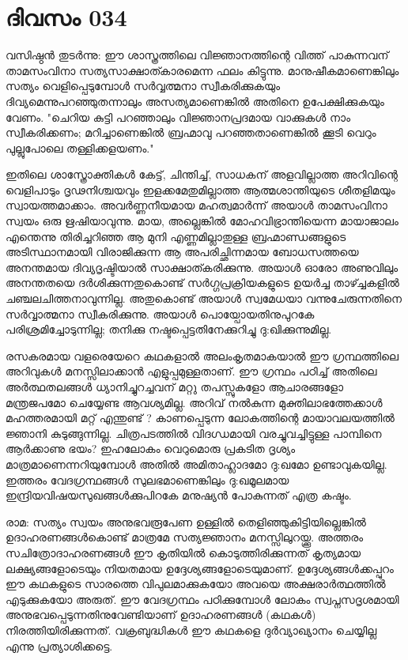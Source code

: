  
\section{ദിവസം 034}


വസിഷ്ഠന്‍ തുടര്‍ന്നു: ഈ ശാസ്ത്രത്തിലെ വിജ്ഞാനത്തിന്റെ വിത്ത്‌ പാകുന്നവന്‌  താമസംവിനാ സത്യസാക്ഷാത്കാരമെന്ന ഫലം കിട്ടുന്നു. മാനുഷീകമാണെങ്കിലും സത്യം വെളിപ്പെടുമ്പോള്‍ സര്‍വ്വത്മനാ സ്വീകരിക്കുകയും ദിവ്യമെന്നുപറഞ്ഞുതന്നാലും അസത്യമാണെങ്കില്‍ അതിനെ ഉപേക്ഷിക്കുകയും വേണം. "ചെറിയ കുട്ടി പറഞ്ഞാലും വിജ്ഞാനപ്രദമായ വാക്കുകള്‍ നാം സ്വീകരിക്കണം;  മറിച്ചാണെങ്കില്‍ ബ്രഹ്മാവു പറഞ്ഞതാണെങ്കില്‍ ക്കൂടി വെറും പുല്ലുപോലെ തള്ളിക്കളയണം."

ഇതിലെ ശാസ്ത്രോക്തികള്‍ കേട്ട്‌, ചിന്തിച്ച്‌, സാധകന്‌ അളവില്ലാത്ത അറിവിന്റെ വെളിപാടും ദൃഢനിശ്ചയവും ഇളക്കമേതുമില്ലാത്ത ആത്മശാന്തിയുടെ ശീതളിമയും സ്വായത്തമാക്കാം. അവര്‍ണ്ണനീയമായ മഹത്വമാര്‍ന്ന് അയാള്‍ താമസംവിനാ സ്വയം ഒരു ഋഷിയാവുന്നു. മായ, അല്ലെങ്കില്‍ മോഹവിഭ്രാന്തിയെന്ന മായാജാലം എന്തെന്നു തിരിച്ചറിഞ്ഞ ആ മുനി എണ്ണമില്ലാതുള്ള ബ്രഹ്മാണ്ഡങ്ങളുടെ അടിസ്ഥാനമായി വിരാജിക്കുന്ന ആ അപരിച്ഛിന്നമായ ബോധസത്തയെ അനന്തമായ ദിവ്യദൃഷ്ടിയാല്‍ സാക്ഷാത്കരിക്കുന്നു. അയാള്‍ ഓരോ അണുവിലും അനന്തതയെ ദര്‍ശിക്കുന്നതുകൊണ്ട്‌ സര്‍ഗ്ഗപ്രക്രിയകളുടെ ഉയര്‍ച്ച താഴ്ച്ചകളില്‍ ചഞ്ചലചിത്തനാവുന്നില്ല. അതുകൊണ്ട്‌ അയാള്‍ സ്വമേധയാ വന്നുചേരുന്നതിനെ സര്‍വ്വാത്മനാ സ്വീകരിക്കുന്നു. അയാള്‍ പൊയ്പോയതിനുപുറകേ പരിശ്രമിച്ചോടുന്നില്ല; തനിക്കു നഷ്ടപ്പെട്ടതിനേക്കുറിച്ചു ദു:ഖിക്കുന്നുമില്ല. 

രസകരമായ വളരെയേറെ കഥകളാല്‍ അലംകൃതമാകയാല്‍ ഈ ഗ്രന്ഥത്തിലെ അറിവുകള്‍ മനസ്സിലാക്കാന്‍ എളുപ്പമുള്ളതാണ്‌. ഈ ഗ്രന്ഥം പഠിച്ച്‌ അതിലെ അര്‍ത്ഥതലങ്ങള്‍ ധ്യാനിച്ചുറച്ചവന്‌ മറ്റു തപസ്സുകളോ ആചാരങ്ങളോ മന്ത്രജപമോ ചെയ്യേണ്ട ആവശ്യമില്ല. അറിവ്‌ നല്‍കുന്ന മുക്തിലാഭത്തേക്കാള്‍ മഹത്തരമായി  മറ്റ്  എന്തുണ്ട് ? കാണപ്പെടുന്ന ലോകത്തിന്റെ മായാവലയത്തില്‍ ജ്ഞാനി കുടുങ്ങുന്നില്ല. ചിത്രപടത്തില്‍ വിദഗ്ധമായി വരച്ചുവച്ചിട്ടുള്ള പാമ്പിനെ ആര്‍ക്കാണു ഭയം? ഇഹലോകം വെറുമൊരു പ്രകടിത ദൃശ്യം മാത്രമാണെന്നറിയുമ്പോള്‍ അതില്‍ അമിതാഹ്ലാദമോ ദു:ഖമോ ഉണ്ടാവുകയില്ല. ഇത്തരം വേദഗ്രന്ഥങ്ങള്‍ സുലഭമാണെങ്കിലും ദു:ഖമൂലമായ ഇന്ദ്രിയവിഷയസുഖങ്ങള്‍ക്കുപിറകേ മനുഷ്യന്‍ പോകുന്നത്‌ എത്ര കഷ്ടം.

രാമ: സത്യം സ്വയം അനുഭവരൂപേണ ഉള്ളില്‍ തെളിഞ്ഞുകിട്ടിയില്ലെങ്കില്‍ ഉദാഹരണങ്ങള്‍കൊണ്ട്‌ മാത്രമേ സത്യജ്ഞാനം മനസ്സിലുറയ്ക്കൂ. അത്തരം സചിത്രോദാഹരണങ്ങള്‍ ഈ കൃതിയില്‍ കൊടുത്തിരിക്കുന്നത്‌ കൃത്യമായ ലക്ഷ്യങ്ങളോടെയും നിയതമായ ഉദ്ദേശ്യങ്ങളോടെയുമാണ്‌. ഉദ്ദേശ്യങ്ങള്‍ക്കപ്പുറം ഈ കഥകളുടെ സാരത്തെ വിപുലമാക്കുകയോ അവയെ അക്ഷരാര്‍ത്ഥത്തില്‍ എടുക്കുകയോ അരുത്‌. ഈ വേദഗ്രന്ഥം പഠിക്കുമ്പോള്‍ ലോകം സ്വപ്നസദൃശമായി അനുഭവപ്പെടുന്നതിനുവേണ്ടിയാണ്‌ ഉദാഹരണങ്ങള്‍ (കഥകള്‍) നിരത്തിയിരിക്കുന്നത്‌. വക്രബുദ്ധികള്‍ ഈ കഥകളെ ദുര്‍വ്യാഖ്യാനം ചെയ്യില്ല എന്നു പ്രത്യാശിക്കട്ടെ.
